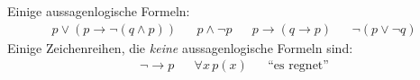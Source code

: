 \begin{example}
Einige aussagenlogische Formeln:
\begin{align*}
&p\lor(p\to \neg(q\land p))&&p\land\neg p&&p\to(q\to p)& &\neg(p\lor\neg q)&
\end{align*}
Einige Zeichenreihen, die \textit{keine} aussagenlogische Formeln sind:
\begin{align*}
&\neg\to p& &\forall x\,p(x)& &\text{``es regnet''}&
\end{align*}
\end{example}